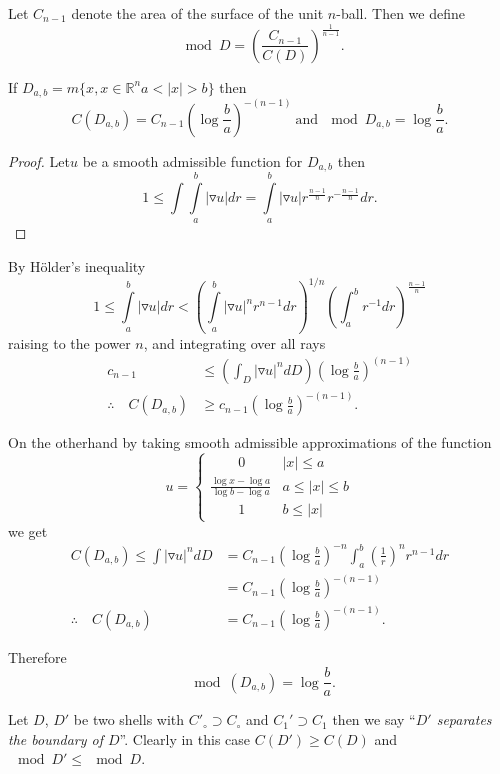 Let $C_{n-1}$ denote the area of the surface of the unit
$n$-ball. Then we define
$$
\mod D= \left(\frac{C_{n-1}}{C(D)} \right)^{\frac{1}{n-1}}.
$$ 

\begin{example} \label{chap10:exp10.2}
  If $D_{a, b}=m \{ x, x \in \mathbb{R}^n a <|x|>b\}$ then 
  $$
  C(D_{a,b}) = C_{n-1} \left(\log \frac{b}{a} \right)^{- (n-1)}
  ~\text{and}~ \mod D_{a,b}= \log \frac{b}{a}.
  $$
\end{example}

\begin{proof}
  Let\pageoriginale $u$ be a smooth admissible function for $D_{a, b}$ then
  $$
  1 \leq \int \int\limits_a^b |\triangledown u| dr = \int\limits_a^b
  |\triangledown u| r^{\frac{n-1}{n}} r^{-\frac{n-1}{n}} dr.
  $$
\end{proof}

By H\"older's inequality
$$
1\leq \int\limits_a^b |\triangledown  u| dr <
\left(\int\limits_a^b|\triangledown u|^n r^{n-1} dr \right)^{1/n}
\left( \int_a^b r^{-1} dr\right)^{\frac{n-1}{n}}
$$
raising to the power $n$, and integrating over all rays
\begin{align*}
  c_{n-1} & \leq \left( \int_D |\triangledown u|^n  dD\right)
  \left(\log \frac{b}{a}\right)^{(n-1)}\\
  \therefore \quad C (D_{a, b}) & \geq c_{n-1} \left(\log
  \frac{b}{a}\right)^{- (n-1)}.
\end{align*}

On the otherhand by taking smooth admissible approximations of the
function
$$
u=
\begin{cases}
  \qquad0 & |x|\leq a\\
  \frac{\log x - \log a}{\log b - \log a} & a \leq |x|\leq b\\
  \qquad 1 & b \leq |x|
\end{cases}
$$
we get 
\begin{align*}
  C(D_{a,b}) \leq \int |\triangledown u|^n dD & = C_{n-1} \left(\log
  \frac{b}{a}\right)^{-n} \int^b_a \left(\frac{1}{r} \right)^n r^{n-1}
  dr\\
  & = C_{n-1} \left( \log \frac{b}{a}\right)^{- (n-1)}\\
  \therefore \quad C(D_{a, b}) & = C_{n-1} \left( \log \frac{b}{a}\right)^{-(n-1)}.
\end{align*}

Therefore\pageoriginale
$$
\mod (D_{a, b})= \log \frac{b}{a}.
$$

\begin{defi*}
  Let $D$, $D'$ be two shells with $C'_\circ \supset C_\circ$ and
  $C_1' \supset C_1$ then we say ``\textit{$D'$ separates the boundary
    of $D$}''. Clearly in this case $C(D')\geq C(D)$ and $\mod D'\leq
  \mod D$. 
\end{defi*}

